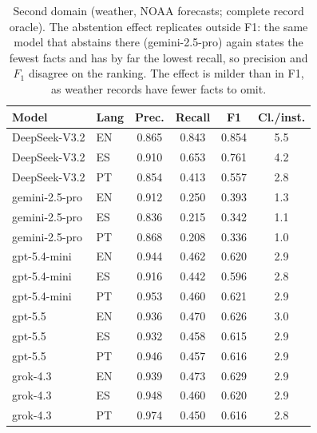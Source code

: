 \begin{table}[t]
\centering\small
\begin{tabular}{llcccc}
\toprule
Model & Lang & Prec. & Recall & F1 & Cl./inst. \\
\midrule
DeepSeek-V3.2 & EN & 0.865 & 0.843 & 0.854 & 5.5 \\
DeepSeek-V3.2 & ES & 0.910 & 0.653 & 0.761 & 4.2 \\
DeepSeek-V3.2 & PT & 0.854 & 0.413 & 0.557 & 2.8 \\
gemini-2.5-pro & EN & 0.912 & 0.250 & 0.393 & 1.3 \\
gemini-2.5-pro & ES & 0.836 & 0.215 & 0.342 & 1.1 \\
gemini-2.5-pro & PT & 0.868 & 0.208 & 0.336 & 1.0 \\
gpt-5.4-mini & EN & 0.944 & 0.462 & 0.620 & 2.9 \\
gpt-5.4-mini & ES & 0.916 & 0.442 & 0.596 & 2.8 \\
gpt-5.4-mini & PT & 0.953 & 0.460 & 0.621 & 2.9 \\
gpt-5.5 & EN & 0.936 & 0.470 & 0.626 & 3.0 \\
gpt-5.5 & ES & 0.932 & 0.458 & 0.615 & 2.9 \\
gpt-5.5 & PT & 0.946 & 0.457 & 0.616 & 2.9 \\
grok-4.3 & EN & 0.939 & 0.473 & 0.629 & 2.9 \\
grok-4.3 & ES & 0.948 & 0.460 & 0.620 & 2.9 \\
grok-4.3 & PT & 0.974 & 0.450 & 0.616 & 2.8 \\
\bottomrule
\end{tabular}
\caption{Second domain (weather, NOAA forecasts; complete record oracle). The abstention effect replicates outside F1: the same model that abstains there (gemini-2.5-pro) again states the fewest facts and has by far the lowest recall, so precision and $F_1$ disagree on the ranking. The effect is milder than in F1, as weather records have fewer facts to omit.}
\label{tab:weather}
\end{table}
